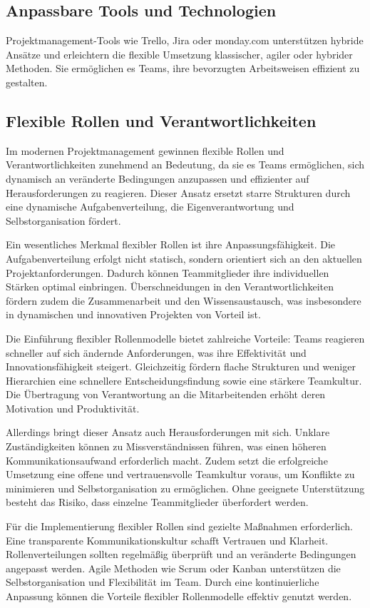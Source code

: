 \documentclass[ngerman]{seminarvorlage}
\begin{document}
\subsection{Anpassbare Tools und Technologien}
Projektmanagement-Tools wie Trello, Jira oder monday.com unterstützen hybride Ansätze und erleichtern die flexible Umsetzung klassischer, agiler oder hybrider Methoden. Sie ermöglichen es Teams, ihre bevorzugten Arbeitsweisen effizient zu gestalten.
\cite{marx_top_2024}

\subsection{Flexible Rollen und Verantwortlichkeiten}  
Im modernen Projektmanagement gewinnen flexible Rollen und Verantwortlichkeiten zunehmend an Bedeutung, da sie es Teams ermöglichen, sich dynamisch an veränderte Bedingungen anzupassen und effizienter auf Herausforderungen zu reagieren. Dieser Ansatz ersetzt starre Strukturen durch eine dynamische Aufgabenverteilung, die Eigenverantwortung und Selbstorganisation fördert.  

Ein wesentliches Merkmal flexibler Rollen ist ihre Anpassungsfähigkeit. Die Aufgabenverteilung erfolgt nicht statisch, sondern orientiert sich an den aktuellen Projektanforderungen. Dadurch können Teammitglieder ihre individuellen Stärken optimal einbringen. Überschneidungen in den Verantwortlichkeiten fördern zudem die Zusammenarbeit und den Wissensaustausch, was insbesondere in dynamischen und innovativen Projekten von Vorteil ist.  

Die Einführung flexibler Rollenmodelle bietet zahlreiche Vorteile: Teams reagieren schneller auf sich ändernde Anforderungen, was ihre Effektivität und Innovationsfähigkeit steigert. Gleichzeitig fördern flache Strukturen und weniger Hierarchien eine schnellere Entscheidungsfindung sowie eine stärkere Teamkultur. Die Übertragung von Verantwortung an die Mitarbeitenden erhöht deren Motivation und Produktivität.  

Allerdings bringt dieser Ansatz auch Herausforderungen mit sich. Unklare Zuständigkeiten können zu Missverständnissen führen, was einen höheren Kommunikationsaufwand erforderlich macht. Zudem setzt die erfolgreiche Umsetzung eine offene und vertrauensvolle Teamkultur voraus, um Konflikte zu minimieren und Selbstorganisation zu ermöglichen. Ohne geeignete Unterstützung besteht das Risiko, dass einzelne Teammitglieder überfordert werden.  

Für die Implementierung flexibler Rollen sind gezielte Maßnahmen erforderlich. Eine transparente Kommunikationskultur schafft Vertrauen und Klarheit. Rollenverteilungen sollten regelmäßig überprüft und an veränderte Bedingungen angepasst werden. Agile Methoden wie Scrum oder Kanban unterstützen die Selbstorganisation und Flexibilität im Team. Durch eine kontinuierliche Anpassung können die Vorteile flexibler Rollenmodelle effektiv genutzt werden.  
\end{document}
